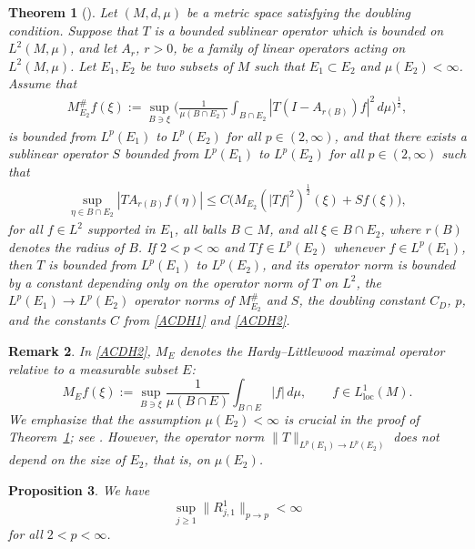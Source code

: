 \documentclass[12pt]{amsart}
\newtheorem{theorem}{Theorem}[section]
\newtheorem{proposition}[theorem]{Proposition}
\newtheorem{remark}[theorem]{Remark}
\begin{document}
\begin{theorem}[{\cite[Theorem~2.4]{ACDH}}]\label{thm_ACDH}
Let $(M,d,\mu)$ be a metric space satisfying the doubling condition. Suppose that $T$ is a bounded sublinear operator which is bounded on $L^2(M,\mu)$, and let $A_r$, $r>0$, be a family of linear operators acting on $L^2(M,\mu)$. Let $E_1,E_2$ be two subsets of $M$ such that $E_1\subset E_2$ and $\mu(E_2)<\infty$. Assume that
\begin{align}\label{ACDH1}
    M^{\#}_{E_2}f(\xi) := \sup_{B\ni \xi} \biggl(\frac{1}{\mu(B\cap E_2)} \int_{B\cap E_2} |T(I-A_{r(B)})f|^2 \, d\mu\biggr)^{\!\frac{1}{2}},
\end{align}
is bounded from $L^p(E_1)$ to $L^p(E_2)$ for all $p\in (2,\infty)$, and that there exists a sublinear operator $S$ bounded from $L^p(E_1)$ to $L^p(E_2)$ for all $p\in (2,\infty)$ such that
\begin{align}\label{ACDH2}
    \sup_{\eta\in B\cap E_2} |TA_{r(B)}f(\eta)| \le C\bigl( M_{E_2}(|Tf|^2)^{\frac{1}{2}}(\xi) + Sf(\xi) \bigr),
\end{align}
for all $f\in L^2$ supported in $E_1$, all balls $B\subset M$, and all $\xi\in B\cap E_2$, where $r(B)$ denotes the radius of $B$. If $2<p<\infty$ and $Tf\in L^p(E_2)$ whenever $f\in L^p(E_1)$, then $T$ is bounded from $L^p(E_1)$ to $L^p(E_2)$, and its operator norm is bounded by a constant depending only on the operator norm of $T$ on $L^2$, the $L^p(E_1)\to L^p(E_2)$ operator norms of $M_{E_2}^{\#}$ and $S$, the doubling constant $C_D$, $p$, and the constants $C$ from \eqref{ACDH1} and \eqref{ACDH2}.
\end{theorem}

\begin{remark}
In \eqref{ACDH2}, $M_E$ denotes the Hardy--Littlewood maximal operator relative to a measurable subset $E$:
\begin{equation*}
    M_E f(\xi) := \sup_{B\ni \xi} \frac{1}{\mu(B \cap E)} \int_{B\cap E} |f| \, d\mu, \qquad f\in L_{\mathrm{loc}}^1(M).
\end{equation*}
We emphasize that the assumption $\mu(E_2)<\infty$ is crucial in the proof of Theorem~\ref{thm_ACDH}; see \cite[Lemma~2.5, 2.6]{ACDH}. However, the operator norm $\|T\|_{L^p(E_1)\to L^p(E_2)}$ does not depend on the size of $E_2$, that is, on $\mu(E_2)$.
\end{remark}

\begin{proposition}\label{Rj,1,1}
We have
    \begin{equation*}
        \sup_{j\ge 1} \|R_{j,1}^1\|_{p\to p} <\infty
    \end{equation*}
    for all $2<p<\infty$.
\end{proposition}
\end{document}
